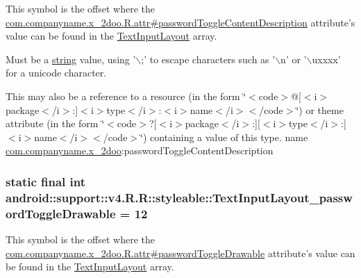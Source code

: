 This symbol is the offset where the \hyperlink{classcom_1_1companyname_1_1x__2doo_1_1_r_1_1attr_c4ffe432a0a15b597d82f611a505e16a}{com.companyname.x\_\-2doo.R.attr\#passwordToggleContentDescription} attribute's value can be found in the \hyperlink{classandroid_1_1support_1_1v4_1_1_r_1_1styleable_880beb171ce483ab1b63a82ef7f9d976}{TextInputLayout} array.

Must be a \hyperlink{classandroid_1_1support_1_1v4_1_1_r_1_1string}{string} value, using '$\backslash$;' to escape characters such as '$\backslash$n' or '$\backslash$uxxxx' for a unicode character. 

This may also be a reference to a resource (in the form \char`\"{}$<$code$>$@\mbox{[}$<$i$>$package$<$/i$>$:\mbox{]}$<$i$>$type$<$/i$>$:$<$i$>$name$<$/i$>$$<$/code$>$\char`\"{}) or theme attribute (in the form \char`\"{}$<$code$>$?\mbox{[}$<$i$>$package$<$/i$>$:\mbox{]}\mbox{[}$<$i$>$type$<$/i$>$:\mbox{]}$<$i$>$name$<$/i$>$$<$/code$>$\char`\"{}) containing a value of this type.  name \hyperlink{namespacecom_1_1companyname_1_1x__2doo}{com.companyname.x\_\-2doo}:passwordToggleContentDescription \hypertarget{classandroid_1_1support_1_1v4_1_1_r_1_1styleable_868c1aeee5f74a15faca475df88aafc1}{
\subsubsection[{TextInputLayout\_\-passwordToggleDrawable}]{\setlength{\rightskip}{0pt plus 5cm}static final int android::support::v4.R.R::styleable::TextInputLayout\_\-passwordToggleDrawable = 12}}
\label{classandroid_1_1support_1_1v4_1_1_r_1_1styleable_868c1aeee5f74a15faca475df88aafc1}


This symbol is the offset where the \hyperlink{classcom_1_1companyname_1_1x__2doo_1_1_r_1_1attr_8b49d719a7def5b905dfe0643421f24d}{com.companyname.x\_\-2doo.R.attr\#passwordToggleDrawable} attribute's value can be found in the \hyperlink{classandroid_1_1support_1_1v4_1_1_r_1_1styleable_880beb171ce483ab1b63a82ef7f9d976}{TextInputLayout} array.

